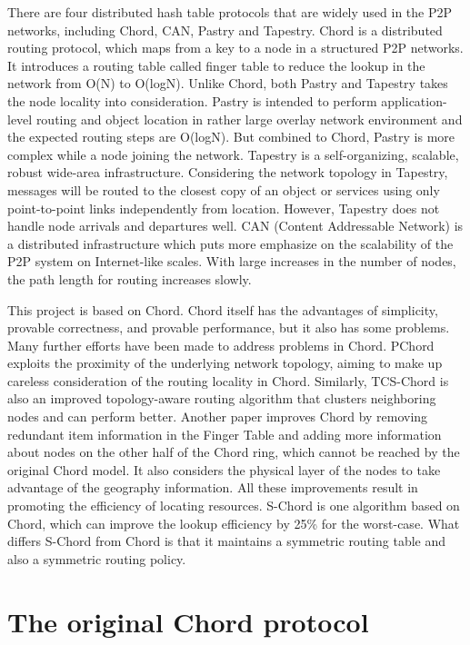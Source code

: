 \documentclass[letterpaper,twocolumn,10pt]{article}
\begin{document}
There are four distributed hash table protocols that are widely used in the P2P networks, including Chord, CAN, Pastry and Tapestry. Chord\cite{chord} is a distributed routing protocol, which maps from a key to a node in a structured P2P networks. It introduces a routing table called finger table to reduce the lookup in the network from O(N) to O(logN). Unlike Chord, both Pastry and Tapestry takes the node locality into consideration. Pastry\cite{pastry} is intended to perform application-level routing and object location in rather large overlay network environment and the expected routing steps are O(logN). But combined to Chord, Pastry is more complex while a node joining the network. Tapestry\cite{tapestry} is a self-organizing, scalable, robust wide-area infrastructure. Considering the network topology in Tapestry, messages will be routed to the closest copy of an object or services using only point-to-point links independently from location. However, Tapestry does not handle node arrivals and departures well. CAN\cite{CAN} (Content Addressable Network) is a distributed infrastructure which puts more emphasize on the scalability of the P2P system on Internet-like scales. With large increases in the number of nodes, the path length for routing increases slowly.

This project is based on Chord. Chord itself has the advantages of simplicity, provable correctness, and provable performance, but it also has some problems. Many further efforts have been made to address problems in Chord. PChord\cite{feng2006pchord} exploits the proximity of the underlying network topology, aiming to make up careless consideration of the routing locality in Chord. Similarly, TCS-Chord\cite{ye2005tcs} is also an improved topology-aware routing algorithm that clusters neighboring nodes and can perform better. Another paper\cite{chen2009improvement} improves Chord by removing redundant item information in the Finger Table and adding more information about nodes on the other half of the Chord ring, which cannot be reached by the original Chord model. It also considers the physical layer of the nodes to take advantage of the geography information. All these improvements result in promoting the efficiency of locating resources. S-Chord\cite{mesaros2002s} is one algorithm based on Chord, which can improve the lookup efficiency by 25\% for the worst-case. What differs S-Chord from Chord is that it maintains a symmetric routing table and also a symmetric routing policy.

\section{The original Chord protocol}
\end{document}

